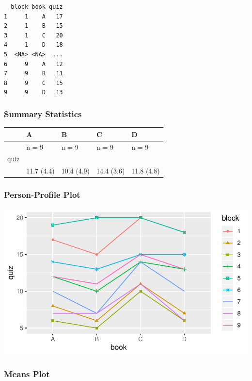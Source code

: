 \documentclass[
]{article}
\begin{document}
\begin{verbatim}
  block book quiz
1     1    A   17
2     1    B   15
3     1    C   20
4     1    D   18
5  <NA> <NA>  ...
6     9    A   12
7     9    B   11
8     9    C   15
9     9    D   13
\end{verbatim}

\clearpage

\hypertarget{summary-statistics-1}{%
\subsubsection{Summary Statistics}\label{summary-statistics-1}}

\begin{longtable}[]{@{}lllll@{}}
\toprule
& A & B & C & D\tabularnewline
\midrule
\endhead
& n = 9 & n = 9 & n = 9 & n = 9\tabularnewline
quiz & & & &\tabularnewline
& 11.7 (4.4) & 10.4 (4.9) & 14.4 (3.6) & 11.8 (4.8)\tabularnewline
\bottomrule
\end{longtable}

\hypertarget{person-profile-plot-3}{%
\subsubsection{Person-Profile Plot}\label{person-profile-plot-3}}

\begin{center}\includegraphics{Chapter-15-Assignment-R-Skeleton--2020spring_files/figure-latex/unnamed-chunk-21-1} \end{center}

\hypertarget{means-plot-1}{%
\subsubsection{Means Plot}\label{means-plot-1}}
\end{document}
